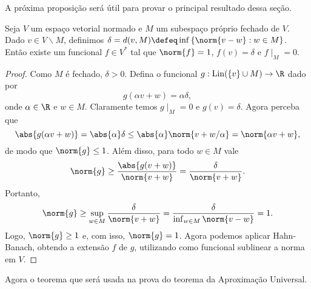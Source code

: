 A próxima proposição será útil para provar o principal resultado dessa seção.
\begin{prop}
    Seja \( V \) um espaço vetorial normado e \( M \) um subespaço próprio fechado de \( V \).
    Dado \( v \in V \backslash M \), definimos \( \delta = d(v, M) \defeq \inf \left\{ \norm{ v - w } : w \in M \right\} \).
    Então existe um funcional \( f \in V^{ * } \) tal que \( \norm{ f } = 1 \), \( f(v) = \delta \) e \( f  \mid_{ M } = 0 \).
    \label{prop: closed_subset}
\end{prop}
\begin{proof}
    Como \( M \) é fechado, \( \delta > 0 \).
    Defina o funcional \( g : \lin ( \left\{ v \right\} \cup M ) \to \R \) dado por
    \begin{equation}
        g(\alpha v + w) = \alpha \delta
    ,\end{equation}
    onde \( \alpha \in \R \) e \( w \in M \).
    Claramente temos \( g \mid_{ M } = 0 \) e \( g(v) = \delta \).
    Agora perceba que
    \begin{equation}
        \abs{ g(\alpha v + w) } = \abs{ \alpha } \delta \leq \abs{ \alpha } \norm{ v + w / \alpha } = \norm{ \alpha v + w }
    ,\end{equation}
    de modo que \( \norm{ g } \leq 1 \).
    Além disso, para todo \( w \in M \) vale
    \begin{equation}
        \norm{ g } \geq \frac{ \abs{ g(v + w) } }{ \norm{ v + w } } = \frac{ \delta }{ \norm{ v + w } }
    .\end{equation}
    Portanto,
    \begin{equation}
        \norm{ g } \geq \sup_{ w \in M } \frac{ \delta }{ \norm{ v + w } } = \frac{ \delta }{ \inf_{ w \in M } \norm{ v - w } } = 1
    .\end{equation}
    Logo, \( \norm{ g } \geq 1 \) e, com isso, \( \norm{ g } = 1 \).
    Agora podemos aplicar Hahn-Banach, obtendo a extensão \( f \) de \( g \), utilizando como funcional sublinear a norma em \( V \).
\end{proof}

Agora o teorema que será usada na prova do teorema da Aproximação Universal.

